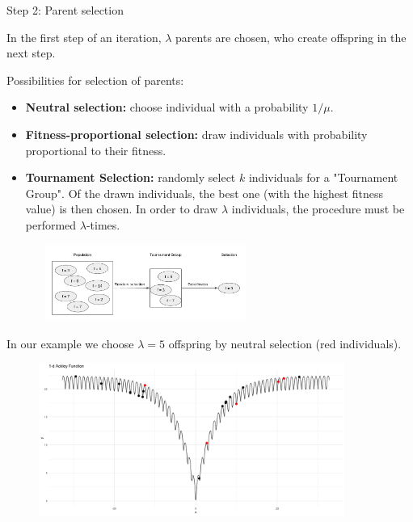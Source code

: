 \begin{frame}{Step 2: Parent selection}


In the first step of an iteration, $\lambda$ parents are chosen, who create offspring in the next step.

Possibilities for selection of parents:
\begin{itemize}
\item \textbf{Neutral selection: }choose individual with a probability $1/\mu$.
\item \textbf{Fitness-proportional selection: }draw individuals with probability proportional to their fitness.
\item \textbf{Tournament Selection: }randomly select $k$ individuals for a "Tournament Group". Of the drawn individuals, the best one (with the highest fitness value) is then chosen. In order to draw $\lambda$ individuals, the procedure must be performed $\lambda$-times.
\end{itemize}
\vspace*{-0.2cm}
\begin{figure}
\includegraphics[width = 7cm, height = 2.5cm ]{images/tournament_selection.png}
\end{figure}

\framebreak

In our example we choose $\lambda = 5$ offspring by neutral selection (red individuals).

\begin{center}
\begin{figure}
\includegraphics[width=\textwidth, height=5cm]{images/ea_ex3.png}
\end{figure}
\end{center}

\end{frame}

